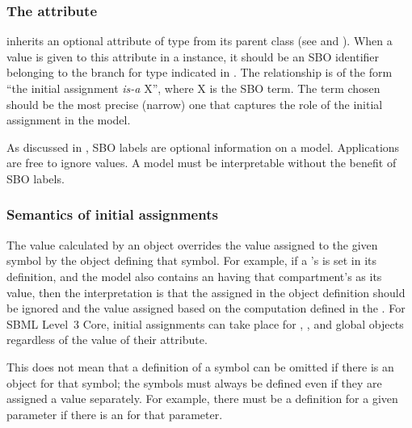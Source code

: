 \subsubsection{The  attribute}
\label{sec:initialassignment-sboterm}

\InitialAssignment inherits an optional 
attribute of type  from its parent
class \SBase (see 
and ).  When a value is given to this
attribute in a \InitialAssignment instance, it should be an
SBO identifier belonging to the branch for type \InitialAssignment  
indicated in .  The relationship is
of the form ``the initial assignment \emph{is-a} X'', where X is
the SBO term.  The term chosen should be the most precise (narrow)
one that captures the role of the initial assignment in the model.

As discussed in , SBO labels are optional
information on a model.  Applications are free to ignore
 values.  A model must be interpretable without the
benefit of SBO labels.


\subsubsection{Semantics of initial assignments}
\label{sec:initial-assignment-semantics}

The value calculated by an \InitialAssignment object overrides the
value assigned to the given symbol by the object defining that
symbol.  For example, if a \Compartment's  is set in
its definition, and the model also contains an \InitialAssignment
having that compartment's  as its  value,
then the interpretation is that the  assigned in the
\Compartment object definition should be ignored and the value
assigned based on the computation defined in the
\InitialAssignment.  For SBML Level~3 Core, initial assignments can take place for
\Compartment, \Species, \SpeciesReference and global \Parameter
objects regardless of the value of their 
attribute.

This does not mean that a definition of a symbol can be omitted if
there is an \InitialAssignment object for that symbol; the symbols
must always be defined even if they are assigned a value
separately.  For example, there must be a \Parameter definition
for a given parameter if there is an \InitialAssignment for that
parameter.

